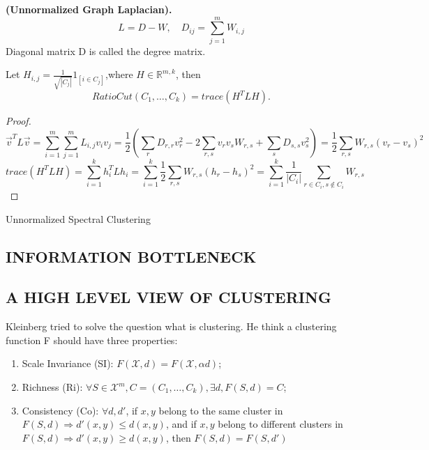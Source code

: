 \begin{definition}
    \textbf{(Unnormalized Graph Laplacian).}
    \[
        L = D - W, \quad D_{ij} = \sum^{m}_{j=1} W_{i,j}
    \]
    Diagonal matrix D is called the degree matrix.
\end{definition}

\begin{lemma}
    Let $ H_{i,j} = \frac{1}{\sqrt{\left| C_j \right|}} 1_{[i \in C_j]}$,where $ H \in \mathbb{R}^{m, k} $, then
    \[
        RatioCut(C_1, \ldots, C_k) = trace(H^T L H).
    \]
    \begin{proof}
        \[
            \vec{v}^T L \vec{v} = \sum^{m}_{i=1} \sum^{m}_{j=1} L_{i,j} v_i v_j = \frac{1}{2} \left( \sum^{}_{r} D_{r,r}v^{2}_{r} - 2 \sum^{}_{r,s} v_r v_s W_{r,s} + \sum^{}_{s} D_{s,s}v^{2}_{s} \right) = \frac{1}{2} \sum^{}_{r,s} W_{r,s}{(v_r - v_s)}^2
        \]
        \[
            trace(H^T L H) = \sum^{k}_{i=1} h^T_{i} L h_i = \sum^{k}_{i=1} \frac{1}{2} \sum^{}_{r,s} W_{r,s}{(h_r - h_s)}^2 = \sum^{k}_{i=1} \frac{1}{\left| C_i \right|} \sum^{}_{r \in C_i, s \notin C_i} W_{r,s}
        \]
    \end{proof}
\end{lemma}

\begin{algorithm}[H]
    \caption{Unnormalized Spectral Clustering}
    \begin{algorithmic}
    \end{algorithmic}
\end{algorithm}

\subsection{INFORMATION BOTTLENECK}%

\subsection{A HIGH LEVEL VIEW OF CLUSTERING}%

Kleinberg tried to solve the question what is clustering. He think a clustering function F should have three properties:
\begin{enumerate}
    \item Scale Invariance (SI): $ F(\mathcal{X}, d) = F(\mathcal{X}, \alpha d) $;
    \item Richness (Ri): $ \forall S \in \mathcal{X}^m, C = \left( C_1, \ldots, C_k \right), \exists d, F(S, d) = C $;
    \item Consistency (Co): $ \forall d, d'$, if $ x,y $ belong to the same cluster in $ F(S,d) \Rightarrow d'(x,y) \le d(x,y) $, and if $ x,y $ belong to different clusters in $ F(S,d) \Rightarrow d'(x,y) \ge d(x,y) $, then $ F(S, d) = F(S, d') $
\end{enumerate}

